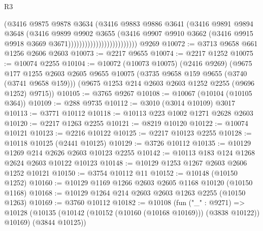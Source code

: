 \begin{lexlean}{R3}
\begin{coremodule}
                                          (@3416
                                            @9875
                                            @9878
                                            @3634
                                            (@3416
                                              @9883
                                              @9886
                                              @3641
                                              (@3416
                                                @9891
                                                @9894
                                                @3648
                                                (@3416
                                                  @9899
                                                  @9902
                                                  @3655
                                                  (@3416
                                                    @9907
                                                    @9910
                                                    @3662
                                                    (@3416
                                                      @9915
                                                      @9918
                                                      @3669
                                                      @3671)))))))))))))))))))))))))
    @9269
@10072 := @3713 @9658 @661 @1256 @2606 @2603
@10073 := @2217 @9655
@10074 := @2217 @1252
@10075 := @10074 @2255
@10104 := @10072
    (@10073 @10075)
    (@2416 @9269)
    (@9675
      @177
      @1255
      @2603
      @2605
      @9655
      @10075
      (@3735 @9658 @159 @9655 (@3740 (@3741 @9658 @159)))
      (@9675 @1253 @214 @2603 @2603 @1252 @2255 (@9696 @1252) @9715))
@10105 := @3765 @9267
@10108 := @10067 (@10104 (@10105 @364))
@10109 := @288 @9735
@10112 := @3010 (@3014 @10109) @3017
@10113 := @3771 @10112
@10118 := @10113 @223 @1002 @1271 @2628 @2603
@10120 := @2217 @1263 @2255
@10121 := @8219 @10120
@10122 := @10074 @10121
@10123 := @2216 @10122
@10125 := @2217 @10123 @2255
@10128 := @10118 @10125 (@2441 @10125)
@10129 := @3726 @10112
@10135 := @10129 @1269 @214 @2626 @2603 @10123 @2255
@10142 := @10113 @183 @124 @1268 @2624 @2603 @10122 @10123
@10148 := @10129 @1253 @1267 @2603 @2606 @1252 @10121
@10150 := @3754 @10112 @11
@10152 := @10148 (@10150 @1252)
@10160 := @10129 @1169 @1266 @2603 @2605 @1168 @10120 (@10150 @1168)
@10168 := @10129 @1264 @214 @2603 @2603 @1263 @2255 (@10150 @1263)
@10169 := @3760 @10112
@10182 := @10108
    (fun ("_" : @9271) =>
    @10128 (@10135 (@10142 (@10152 (@10160 (@10168 @10169))) (@3838 @10122)) @10169) (@3844 @10125))

\end{coremodule}
\end{lexlean}
